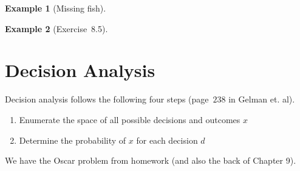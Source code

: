 \documentclass{article}
\newtheorem{example}{Example}
\begin{document}
\begin{example}[Missing fish]
\end{example}

\begin{example}[Exercise~8.5]
\end{example}

\section{Decision Analysis}

Decision analysis follows the following four steps (page~$238$ in Gelman et. al).
\begin{enumerate}
	\item 
		Enumerate the space of all possible decisions and outcomes $x$
	\item
		Determine the probability of $x$ for each decision $d$
\end{enumerate}

We have the Oscar problem from homework (and also the back of Chapter 9).
\end{document}
